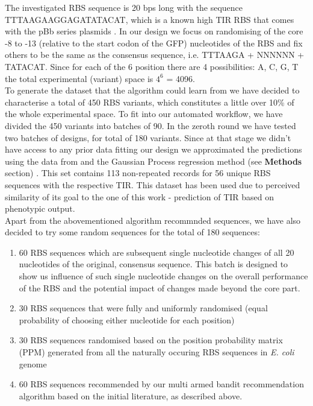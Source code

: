 \documentclass{article}
\begin{document}
The investigated RBS sequence is 20 bps long with the sequence TTTAAGAAGGAGATATACAT, which is a known high TIR RBS that comes with the pBb series plasmids \cite{Lee2011}. 
In our design we focus on randomising of the core -8 to -13 (relative to the start codon of the GFP) nucleotides of the RBS and fix others to be the same as the consensus sequence, i.e. TTTAAGA + NNNNNN + TATACAT.
Since for each of the 6 position there are 4 possibilities: A, C, G, T the total experimental (variant) space is $4^6$ = 4096.\\
To generate the dataset that the algorithm could learn from we have decided to characterise a total of 450 RBS variants, which constitutes a little over 10\% of the whole experimental space. 
To fit into our automated workflow, we have divided the 450 variants into batches of 90.
In the zeroth round we have tested two batches of designs, for total of 180 variants. 
Since at that stage we didn't have access to any prior data fitting our design we approximated the predictions using the data from \textcite{jervis2018machine} and the Gaussian Process regression method (see \textbf{Methods} section) \cite{srinivas2012information}.
This set contains 113 non-repeated records for 56 unique RBS sequences with the respective TIR.
This dataset has been used due to perceived similarity of its goal to the one of this work - prediction of TIR based on phenotypic output.\\
Apart from the abovementioned algorithm recommnded sequences, we have also decided to try some random sequences for the total of 180 sequences:

\begin{enumerate}
    \item 60 RBS sequences which are subsequent single nucleotide changes of all 20 nucleotides of the original, consensus sequence. This batch is designed to show us influence of such single nucleotide changes on the overall performance of the RBS and the potential impact of changes made beyond the core part.
    \item 30 RBS sequences that were fully and uniformly randomised (equal probability of choosing either nucleotide for each position) 
    \item 30 RBS sequences randomised based on the position probability matrix (PPM) generated from all the naturally occuring RBS sequences in \emph{E. coli} genome
    \item 60 RBS sequences recommended by our multi armed bandit recommendation algorithm based on the initial literature, as described above.
\end{enumerate}{}
\end{document}
